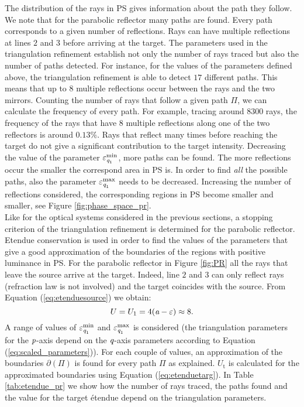 \begin{figure}[h]
\end{figure} The distribution of the rays in PS gives information about the path they follow. We note that for the parabolic reflector many paths are found. Every path corresponds to a given number of reflections. Rays can have multiple reflections at lines $2$ and $3$ before arriving at the target. The parameters used in the triangulation refinement establish not only the number of rays traced but also the number of paths detected. For instance, for the values of the parameters defined above, the triangulation refinement is able to detect $17$ different paths. This means that up to $8$ multiple reflections occur between the rays and the two mirrors. Counting the number of rays that follow a given path $\Pi$, we can calculate the frequency of every path. For example, tracing around $8300$ rays, the frequency of the rays that have $8$ multiple reflections along one of the two reflectors is around $0.13\%$. Rays that reflect many times before reaching the target do not give a significant contribution to the target intensity. Decreasing the value of the parameter $\varepsilon_{\textit{q}_1}^{\textrm{min}}$, more paths can be found. The more reflections occur the smaller the correspond area in PS is. In order to find \textit{all} the possible paths, also the parameter $\varepsilon_{\textit{q}_1}^{\textrm{max}}$ needs to be decreased. Increasing the number of reflections considered, the corresponding regions in PS become smaller and smaller, see Figure \ref{fig:phase_space_pr}. \\ \indent Like for the optical systems considered in the previous sections, a stopping criterion of the triangulation refinement is determined for the parabolic reflector. Etendue conservation is used in order to find the values of the parameters that give a good approximation of the boundaries of the regions with positive luminance in PS. For the parabolic reflector in Figure \ref{fig:PR} all the rays that leave the source arrive at the target. Indeed, line $2$ and $3$ can only reflect rays (refraction law is not involved) and the target coincides with the source. From Equation (\ref{eq:etenduesource}) we obtain:
\begin{equation}
U = U_1 = 4(\textit{a}-\varepsilon)\approx 8.
\end{equation}
A range of values of $\varepsilon_{\textit{q}_1}^{\textrm{min}}$ and $\varepsilon_{\textit{q}_1}^{\textrm{max}}$ is considered (the triangulation parameters for the $\textit{p}$-axis depend on the $\textit{q}$-axis parameters according to Equation (\ref{eq:scaled_parameters})). For each couple of values, an approximation of the boundaries $\partial$$(\Pi)$ is found for every path $\Pi$ as explained. $U_{\textrm{t}}$ is calculated for the approximated boundaries using Equation (\ref{eq:etenduetarg}). In Table \ref{tab:etendue_pr} we show how the number of rays traced, the paths found and the value for the target \'{e}tendue depend on the triangulation parameters.
